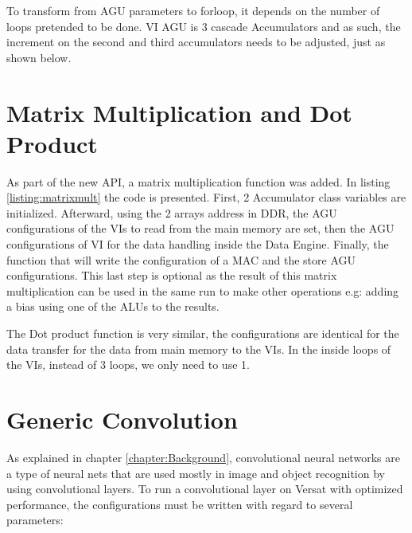 

To transform from AGU parameters to forloop, it depends on the number of loops pretended to be done. VI AGU is 3 cascade Accumulators
and as such, the increment on the second and third accumulators needs to be adjusted, just as shown below.



\section{Matrix Multiplication and Dot Product}

As part of the new API, a matrix multiplication function was added. In listing \ref{listing:matrixmult} the code is presented. First, 2 Accumulator class variables are initialized.
Afterward, using the 2 arrays address in DDR, the AGU configurations of the VIs to read from the main memory are set, then the AGU configurations of VI for the data handling inside the Data Engine.
Finally, the function that will write the configuration of a MAC and the store AGU configurations. This last step is optional as the result of this matrix multiplication can be used in the same run
to make other operations e.g: adding a bias using one of the ALUs to the results.



The Dot product function is very similar, the configurations are identical for the data transfer for the data from main memory to the VIs. In the inside loops of the VIs, instead of 3 loops, we only need to use 
1.

\section{Generic Convolution}

As explained in chapter \ref*{chapter:Background}, convolutional neural networks are a type of neural nets that are 
used mostly in image and object recognition by using convolutional layers. To run a convolutional layer on Versat with
optimized performance, the configurations must be written with regard to several parameters:


